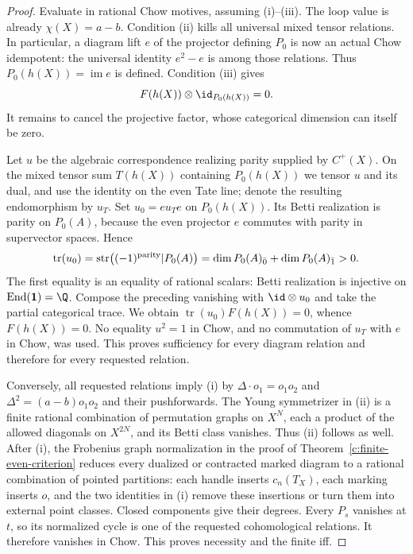 \begin{proof}
Evaluate in rational Chow motives, assuming (i)--(iii).  The loop
value is already $\chi(X)=a-b$.  Condition (ii) kills all universal
mixed tensor relations.  In particular, a diagram lift $e$ of the
projector defining $P_0$ is now an actual Chow idempotent: the
universal identity $e^2-e$ is among those relations.  Thus
$P_0(h(X))=\operatorname{im}e$ is defined.  Condition (iii) gives
\[
 F(h(X))\otimes\id_{P_0(h(X))}=0.
\]
It remains to cancel the projective factor, whose categorical
dimension can itself be zero.

Let $u$ be the algebraic correspondence realizing parity supplied
by $C^+(X)$.  On the mixed tensor sum $T(h(X))$ containing $P_0(h(X))$
we tensor $u$ and its dual, and use the identity on the even Tate
line; denote the resulting endomorphism by $u_T$.
Set $u_0=e u_T e$ on $P_0(h(X))$.  Its Betti realization is
parity on $P_0(A)$, because the even projector $e$ commutes with
parity in supervector spaces.  Hence
\[
 \operatorname{tr}(u_0)
  =\operatorname{str}\bigl((-1)^{\rm parity}|P_0(A)\bigr)
  =\dim P_0(A)_{\bar0}+\dim P_0(A)_{\bar1}>0.
\]
The first equality is an equality of rational scalars: Betti
realization is injective on $\operatorname{End}(\mathbf1)=\Q$.
Compose the preceding vanishing with $\id\otimes u_0$ and take
the partial categorical trace.  We obtain
$\operatorname{tr}(u_0)F(h(X))=0$, whence $F(h(X))=0$.
No equality $u^2=1$ in Chow, and no commutation of $u_T$ with $e$
in Chow, was used.  This proves sufficiency for every diagram
relation and therefore for every requested relation.

Conversely, all requested relations imply (i) by
$\Delta\cdot o_1=o_1o_2$ and
$\Delta^2=(a-b)o_1o_2$ and their pushforwards.  The Young
symmetrizer in (ii) is a finite rational combination of permutation
graphs on $X^N$, each a product of the allowed diagonals on
$X^{2N}$, and its Betti class vanishes.  Thus (ii) follows as well.
After (i), the Frobenius graph normalization in the proof of
Theorem~\ref{c:finite-even-criterion} reduces every dualized or
contracted marked diagram to a rational combination of pointed
partitions: each handle inserts $c_n(T_X)$, each marking inserts
$o$, and the two identities in (i) remove these insertions or turn
them into external point classes.  Closed components give their
degrees.  Every $P_s$ vanishes at $t$, so its normalized cycle is
one of the requested cohomological relations.  It therefore
vanishes in Chow.  This proves necessity and the finite iff.
\end{proof}

